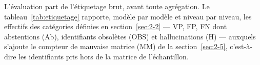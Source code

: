 
\iffalse
L'évaluation part de l'étiquetage brut, avant toute agrégation. Le tableau~\ref{tab:etiquetage} rapporte, modèle par modèle et niveau par niveau, les effectifs des catégories définies en section~\ref{sec:2-2} --- VP, FP, FN dont abstentions (Ab), identifiants obsolètes (OBS) et hallucinations (H) --- auxquels s'ajoute le compteur de mauvaise matrice (MM) de la section~\ref{sec:2-5}, c'est-à-dire les identifiants pris hors de la matrice de l'échantillon.

